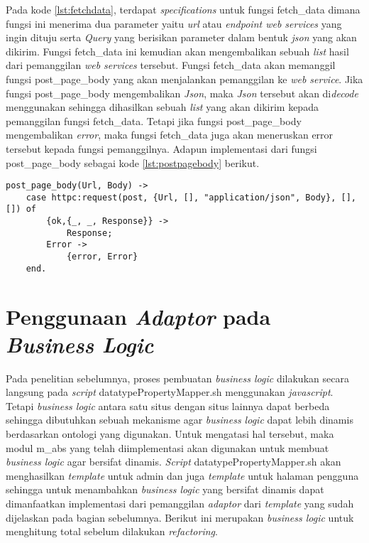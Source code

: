 Pada kode \ref{lst:fetchdata}, terdapat \textit{specifications} untuk fungsi fetch\_data dimana fungsi ini menerima dua parameter yaitu \textit{url} atau \textit{endpoint web services} yang ingin dituju serta \textit{Query} yang berisikan parameter dalam bentuk \textit{json} yang akan dikirim. Fungsi fetch\_data ini kemudian akan mengembalikan sebuah \textit{list} hasil dari pemanggilan \textit{web services} tersebut. Fungsi fetch\_data akan memanggil fungsi post\_page\_body yang akan menjalankan pemanggilan ke \textit{web service}. Jika fungsi post\_page\_body mengembalikan \textit{Json}, maka \textit{Json} tersebut akan di\textit{decode} menggunakan  sehingga dihasilkan sebuah \textit{list} yang akan dikirim kepada pemanggilan fungsi fetch\_data. Tetapi jika fungsi post\_page\_body mengembalikan \textit{error}, maka fungsi fetch\_data juga akan meneruskan error tersebut kepada fungsi pemanggilnya. Adapun implementasi dari fungsi post\_page\_body sebagai kode \ref{lst:postpagebody} berikut.

\begin{minipage}{\linewidth}
\begin{lstlisting}[caption={Implementasi fungsi post\_page\_body},label={lst:postpagebody}]
post_page_body(Url, Body) ->
	case httpc:request(post, {Url, [], "application/json", Body}, [], []) of
		{ok,{_, _, Response}} ->
			Response;
		Error ->
			{error, Error}
	end.
\end{lstlisting}
\end{minipage}
\section{Penggunaan \textit{Adaptor} pada \textit{Business Logic}}

Pada penelitian sebelumnya, proses pembuatan \textit{business logic} dilakukan secara langsung pada \textit{script} datatypePropertyMapper.sh menggunakan \textit{javascript}. Tetapi \textit{business logic} antara satu situs dengan situs lainnya dapat berbeda sehingga dibutuhkan sebuah mekanisme agar \textit{business logic} dapat lebih dinamis berdasarkan ontologi yang digunakan. Untuk mengatasi hal tersebut, maka modul m\_abs yang telah diimplementasi akan digunakan untuk membuat \textit{business logic} agar bersifat dinamis. \textit{Script} datatypePropertyMapper.sh akan menghasilkan \textit{template} untuk admin dan juga \textit{template} untuk halaman pengguna sehingga untuk menambahkan \textit{business logic} yang bersifat dinamis dapat dimanfaatkan implementasi dari pemanggilan \textit{adaptor} dari \textit{template} yang sudah dijelaskan pada bagian sebelumnya. Berikut ini merupakan \textit{business logic} untuk menghitung total sebelum dilakukan \textit{refactoring}.
	
